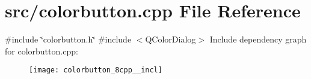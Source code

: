 \section{src/colorbutton.cpp File Reference}
\label{colorbutton_8cpp}
{\ttfamily \#include \char`\"{}colorbutton.\+h\char`\"{}}\newline
{\ttfamily \#include $<$Q\+Color\+Dialog$>$}\newline
Include dependency graph for colorbutton.\+cpp\+:\nopagebreak
\begin{figure}[H]
\begin{center}
\leavevmode
\texttt{[image: colorbutton\_8cpp\_\_incl]}
\end{center}
\end{figure}
